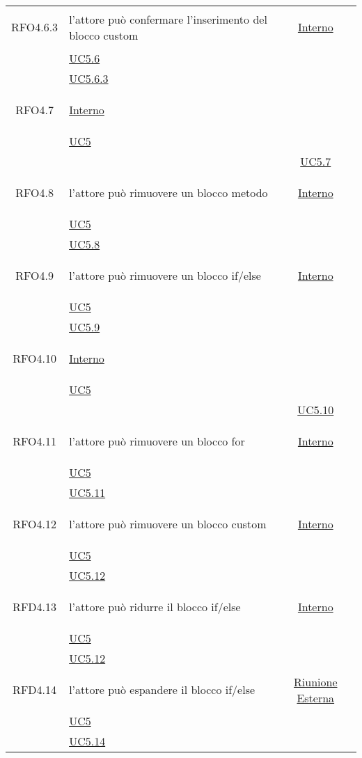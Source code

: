\begin{longtable}{|c|>{\centering}m{7cm}|c|}
\hypertarget{RFO4.6.3}{RFO4.6.3} & l’attore può confermare l'inserimento del blocco custom &\hyperlink{Interno}{Interno}\\
& \hyperref[UC5.6]{UC5.6}\\
& \hyperref[UC5.6.3]{UC5.6.3}\\ \hline

\hypertarget{RFO4.7}{RFO4.7} & \hyperlink{Interno}{Interno}\\
& \hyperref[UC5]{UC5}\\
& & \hyperref[UC5.7]{UC5.7}\\ \hline

\hypertarget{RFO4.8}{RFO4.8} & l'attore può rimuovere un blocco metodo & \hyperlink{Interno}{Interno}\\
& \hyperref[UC5]{UC5}\\
& \hyperref[UC5.8]{UC5.8}\\ \hline

\hypertarget{RFO4.9}{RFO4.9} & l'attore può rimuovere un blocco if/else & \hyperlink{Interno}{Interno}\\
& \hyperref[UC5]{UC5}\\
& \hyperref[UC5.9]{UC5.9}\\ \hline

\hypertarget{RFO4.10}{RFO4.10} & \hyperlink{Interno}{Interno}\\
& \hyperref[UC5]{UC5}\\
& & \hyperref[UC5.10]{UC5.10}\\ \hline

\hypertarget{RFO4.11}{RFO4.11} & l'attore può rimuovere un blocco for & \hyperlink{Interno}{Interno}\\
& \hyperref[UC5]{UC5}\\
& \hyperref[UC5.11]{UC5.11}\\ \hline

\hypertarget{RFO4.12}{RFO4.12} & l'attore può rimuovere un blocco custom & \hyperlink{Interno}{Interno}\\
& \hyperref[UC5]{UC5}\\
& \hyperref[UC5.12]{UC5.12}\\ \hline

\hypertarget{RFD4.13}{RFD4.13} & l'attore può ridurre il blocco if/else & \hyperlink{Interno}{Interno}\\
& \hyperref[UC5]{UC5}\\
& \hyperref[UC5.12]{UC5.12}\\ \hline

\hypertarget{RFD4.14}{RFD4.14} & l'attore può espandere il blocco if/else & \hyperlink{Riunione Esterna}{Riunione Esterna}\\
& \hyperref[UC5]{UC5}\\
& \hyperref[UC5.14]{UC5.14}\\ \hline


\end{longtable}
